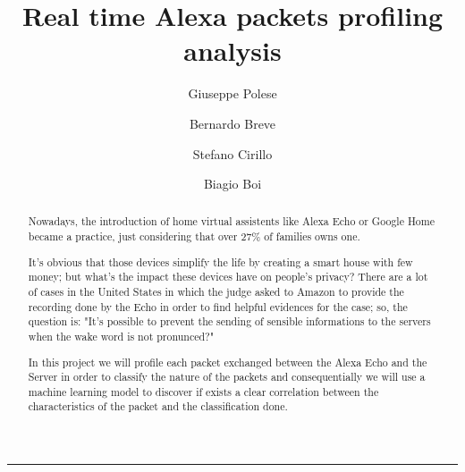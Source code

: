\documentclass[sigconf]{acmart}
\begin{document}
    \title{Real time Alexa packets profiling analysis}


    \author{Giuseppe Polese}

    \author{Bernardo Breve}
    \author{Stefano Cirillo}

    \author{Biagio Boi}

    \begin{abstract}
        Nowadays, the introduction of home virtual assistents like Alexa Echo or Google Home became a practice, just considering that over 27\% of families owns one.

        It's obvious that those devices simplify the life by creating a smart house with few money; but what's the impact these devices have on people's privacy?
        There are a lot of cases in the United States in which the judge asked to Amazon to provide the recording done by the Echo in order to find helpful
        evidences for the case; so, the question is: "It's possible to prevent the sending of sensible informations to the servers when the wake word is not pronunced?"

        In this project we will profile each packet exchanged between the Alexa Echo and the Server in order to classify the nature of the packets and consequentially we will use a machine learning model to discover if exists a clear correlation between the characteristics of the packet and the classification done.
    \end{abstract}



    \begin{teaserfigure}
        \rule{\linewidth}{1mm}
    \end{teaserfigure}
\end{document}
